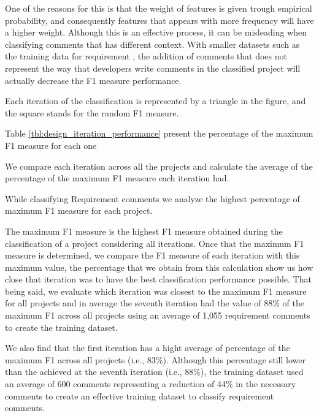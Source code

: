 One of the reasons for this is that the weight of features is given trough empirical probability, and consequently features that appears with more frequency will have a higher weight. Although this is an effective process, it can be misleading when classifying comments that has different context. With smaller datasets such as the training data for requirement \SATD, the addition of comments that does not represent the way that developers write comments in the classified project will actually decrease the F1 measure performance. 




Each iteration of the classification is represented by a triangle in the figure, and the square stands for the random F1 measure. 

Table \ref{tbl:design_iteration_performance} present the percentage of the maximum F1 measure for each one 

We compare each iteration across all the projects and calculate the average of the percentage of the maximum F1 measure each iteration had.








While classifying Requirement \SATD comments we analyze the highest percentage of maximum F1 measure for each project. 

The maximum F1 measure is the highest F1 measure obtained during the classification of a project considering all iterations. Once that the maximum F1 measure is determined, we compare the F1 measure of each iteration with this maximum value, the percentage that we obtain from this calculation show us how close that iteration was to have the best classification performance possible. That being said, we evaluate which iteration was closest to the maximum F1 measure for all projects and in average the seventh iteration had the value of 88\% of the maximum F1 across all projects using an average of 1,055 requirement \SATD comments to create the training dataset.  

We also find that the first iteration has a hight average of percentage of the maximum F1 across all projects (i.e., 83\%). Although this percentage still lower than the achieved at the seventh iteration (i.e., 88\%), the training dataset used an average of 600 \SATD comments representing a reduction of 44\% in the necessary comments to create an effective training dataset
to classify requirement \SATD comments.


